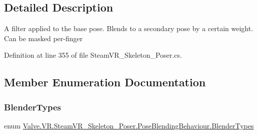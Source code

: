 \subsection{Detailed Description}
A filter applied to the base pose. Blends to a secondary pose by a certain weight. Can be masked per-\/finger 



Definition at line 355 of file Steam\+V\+R\+\_\+\+Skeleton\+\_\+\+Poser.\+cs.



\subsection{Member Enumeration Documentation}
\mbox{\label{class_valve_1_1_v_r_1_1_steam_v_r___skeleton___poser_1_1_pose_blending_behaviour_a21b1f78c5e6dbf96a079d555954a6ae6}} 
\subsubsection{\texorpdfstring{BlenderTypes}{BlenderTypes}}
{\footnotesize\ttfamily enum \mbox{\hyperlink{class_valve_1_1_v_r_1_1_steam_v_r___skeleton___poser_1_1_pose_blending_behaviour_a21b1f78c5e6dbf96a079d555954a6ae6}{Valve.\+V\+R.\+Steam\+V\+R\+\_\+\+Skeleton\+\_\+\+Poser.\+Pose\+Blending\+Behaviour.\+Blender\+Types}}\hspace{0.3cm}{\ttfamily [strong]}}

